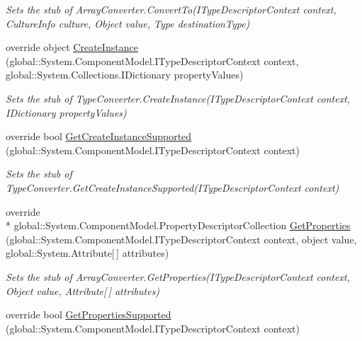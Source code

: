 \begin{DoxyCompactItemize}
\begin{DoxyCompactList}\small\item\em Sets the stub of Array\-Converter.\-Convert\-To(\-I\-Type\-Descriptor\-Context context, Culture\-Info culture, Object value, Type destination\-Type)\end{DoxyCompactList}\item 
override object \hyperlink{class_system_1_1_component_model_1_1_fakes_1_1_stub_array_converter_a579ce60b33e7d0171cd60defb7dfa02e}{Create\-Instance} (global\-::\-System.\-Component\-Model.\-I\-Type\-Descriptor\-Context context, global\-::\-System.\-Collections.\-I\-Dictionary property\-Values)
\begin{DoxyCompactList}\small\item\em Sets the stub of Type\-Converter.\-Create\-Instance(\-I\-Type\-Descriptor\-Context context, I\-Dictionary property\-Values)\end{DoxyCompactList}\item 
override bool \hyperlink{class_system_1_1_component_model_1_1_fakes_1_1_stub_array_converter_aa6422f2a0ecc5cac825c718cd416f8e9}{Get\-Create\-Instance\-Supported} (global\-::\-System.\-Component\-Model.\-I\-Type\-Descriptor\-Context context)
\begin{DoxyCompactList}\small\item\em Sets the stub of Type\-Converter.\-Get\-Create\-Instance\-Supported(\-I\-Type\-Descriptor\-Context context)\end{DoxyCompactList}\item 
override \\*
global\-::\-System.\-Component\-Model.\-Property\-Descriptor\-Collection \hyperlink{class_system_1_1_component_model_1_1_fakes_1_1_stub_array_converter_a648894713bd6bbcfa5ef8918a7fed554}{Get\-Properties} (global\-::\-System.\-Component\-Model.\-I\-Type\-Descriptor\-Context context, object value, global\-::\-System.\-Attribute\mbox{[}$\,$\mbox{]} attributes)
\begin{DoxyCompactList}\small\item\em Sets the stub of Array\-Converter.\-Get\-Properties(\-I\-Type\-Descriptor\-Context context, Object value, Attribute\mbox{[}$\,$\mbox{]} attributes)\end{DoxyCompactList}\item 
override bool \hyperlink{class_system_1_1_component_model_1_1_fakes_1_1_stub_array_converter_a85ce413e48ee426dafef0fb5dc9be719}{Get\-Properties\-Supported} (global\-::\-System.\-Component\-Model.\-I\-Type\-Descriptor\-Context context)

\end{DoxyCompactItemize}
